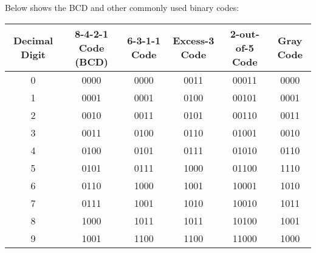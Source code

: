 \documentclass[a4paper,12pt]{report}
\begin{document}
Below shows the BCD and other commonly used binary codes:
\begin{longtable}[c]{|c|c|c|c|c|c|}
\hline
Decimal Digit & 8-4-2-1 Code (BCD) & 6-3-1-1 Code & Excess-3 Code & 2-out-of-5 Code & Gray Code\\\hline
0 & 0000 & 0000 & 0011 & 00011 & 0000\\\hline
1 & 0001 & 0001 & 0100 & 00101 & 0001\\\hline
2 & 0010 & 0011 & 0101 & 00110 & 0011\\\hline
3 & 0011 & 0100 & 0110 & 01001 & 0010\\\hline
4 & 0100 & 0101 & 0111 & 01010 & 0110\\\hline
5 & 0101 & 0111 & 1000 & 01100 & 1110\\\hline
6 & 0110 & 1000 & 1001 & 10001 & 1010\\\hline
7 & 0111 & 1001 & 1010 & 10010 & 1011\\\hline
8 & 1000 & 1011 & 1011 & 10100 & 1001\\\hline
9 & 1001 & 1100 & 1100 & 11000 & 1000\\\hline
\end{longtable}\FB
\end{document}
